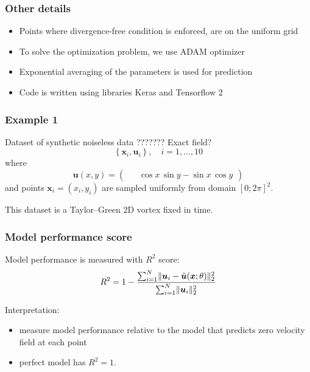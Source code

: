 \documentclass{beamer}
\def\\{}%
\renewcommand{\vec}[1]{\boldsymbol{#1}}
\DeclarePairedDelimiter\norm{\lVert}{\rVert}
\begin{document}
\begin{frame}
\frametitle{Other details}

\begin{itemize}
    \item Points where divergence-free condition is enforced, are on the uniform grid
    \item To solve the optimization problem, we use ADAM optimizer
    \item Exponential averaging of the parameters is used for prediction
    \item Code is written using libraries Keras and Tensorflow 2
\end{itemize}

\end{frame}

\begin{frame}
\frametitle{Example 1}

Dataset of synthetic noiseless data  ??????? Exact field?   
\[
    \left\{\vec{x}_i, \vec{u}_i\right\}, \quad i = 1, ..., 10
\]
where
\[
    \vec u(x, y) = \begin{pmatrix}
        \phantom{-} \cos x \, \sin y\\
        -\sin x \, \cos y
    \end{pmatrix}
\]
and points $\vec x_i = (x_i, y_i)$ are sampled uniformly from domain $[0; 2\pi]^2$.

This dataset is a Taylor--Green 2D vortex fixed in time.
\end{frame}

\begin{frame}
\frametitle{Model performance score}

Model performance is measured with $R^2$ score:    
\[
    R^2 = 1 - \frac{
        \sum_{i=1}^N \norm{\vec u_i - \hat{\vec u}(\vec x; \theta)}^2_2
    }{
        \sum_{i=1}^N \norm{\vec u_i}^2_2
    }
\]

\vspace{0.5cm}
Interpretation:
\begin{itemize}
    \item measure model performance relative to the model that
          predicts zero velocity field at each point
    \item perfect model has $R^2=1$.
\end{itemize}
\end{frame}
\end{document}
